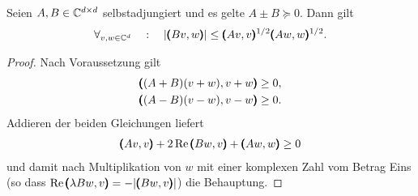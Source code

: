 \begin{lem}\label{Matrizenlemma}
	Seien $A,B\in\mathbb C^{d\times d}$ selbstadjungiert und es gelte $A\pm B \succeq 0$. Dann gilt
	\begin{align}
		\forall_{v,w \in \mathbb{C}^d} \quad: \quad \vert \pmb(Bv,w\pmb) \vert \le \pmb(Av,v\pmb)^{{1}/{2}}\pmb(Aw,w\pmb)^{{1}/{2}}. 
	\end{align}
\end{lem}
\begin{proof}
	Nach Voraussetzung gilt
	\begin{align}\begin{split}
		&\pmb((A+B)(v+w),v+w\pmb) \ge 0,\\
		&\pmb((A-B)(v-w),v-w\pmb) \ge 0.
		\end{split}
	\end{align}
	Addieren der beiden Gleichungen liefert
	\begin{align}
		\pmb(Av,v\pmb)+2\operatorname{Re} \pmb(Bw,v\pmb) +\pmb(Aw,w\pmb) \ge 0
	\end{align}
	und damit nach Multiplikation von $w$ mit einer komplexen Zahl vom Betrag Eins (so dass $\operatorname{Re} \pmb(\lambda Bw,v\pmb) = - | \pmb(Bw,v\pmb)|$) die Behauptung. 
\end{proof}


